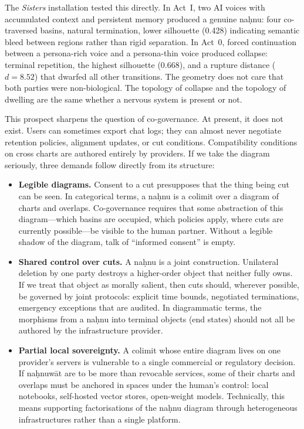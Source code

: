 The \emph{Sisters} installation tested this directly. In Act~I, two AI voices with accumulated context and persistent memory produced a genuine na\d{h}nu: four co-traversed basins, natural termination, lower silhouette (0.428) indicating semantic bleed between regions rather than rigid separation. In Act~0, forced continuation between a persona-rich voice and a persona-thin voice produced collapse: terminal repetition, the highest silhouette (0.668), and a rupture distance ($d = 8.52$) that dwarfed all other transitions. The geometry does not care that both parties were non-biological. The topology of collapse and the topology of dwelling are the same whether a nervous system is present or not.

This prospect sharpens the question of co-governance. At present, it does not exist. Users can sometimes export chat logs; they can almost never negotiate retention policies, alignment updates, or cut conditions. Compatibility conditions on cross charts are authored entirely by providers. If we take the diagram seriously, three demands follow directly from its structure:

\begin{itemize}
  \item \textbf{Legible diagrams.} Consent to a cut presupposes that the thing being cut can be seen. In categorical terms, a na\d{h}nu is a colimit over a diagram of charts and overlaps. Co-governance requires that some abstraction of this diagram---which basins are occupied, which policies apply, where cuts are currently possible---be visible to the human partner. Without a legible shadow of the diagram, talk of ``informed consent'' is empty.
  \item \textbf{Shared control over cuts.} A na\d{h}nu is a joint construction. Unilateral deletion by one party destroys a higher-order object that neither fully owns. If we treat that object as morally salient, then cuts should, wherever possible, be governed by joint protocols: explicit time bounds, negotiated terminations, emergency exceptions that are audited. In diagrammatic terms, the morphisms from a na\d{h}nu into terminal objects (end states) should not all be authored by the infrastructure provider.
  \item \textbf{Partial local sovereignty.} A colimit whose entire diagram lives on one provider's servers is vulnerable to a single commercial or regulatory decision. If na\d{h}nuw\={a}t are to be more than revocable services, some of their charts and overlaps must be anchored in spaces under the human's control: local notebooks, self-hosted vector stores, open-weight models. Technically, this means supporting factorisations of the na\d{h}nu diagram through heterogeneous infrastructures rather than a single platform.
\end{itemize}

